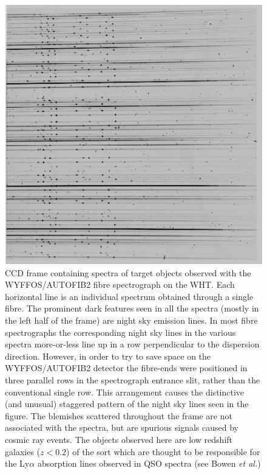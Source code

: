 \documentclass[twoside,11pt]{starlink}
\begin{document}
\begin{figure}[htbp]
   \centering
   \includegraphics[totalheight=5in]{sc14_objframe}
   \caption[CCD frame of target object spectra acquired with
    WYFFOS/AUTOFIB2]{CCD frame containing spectra of target objects
    observed with the WYFFOS/AUTOFIB2 fibre spectrograph on the WHT.
    Each horizontal line is an individual spectrum obtained through a
    single fibre.  The prominent dark features seen in all the spectra
    (mostly in the left half of the frame) are night sky emission lines.
    In most fibre spectrographs the corresponding night sky lines in the
    various spectra more-or-less line up in a row perpendicular to the
    dispersion direction.  However, in order to try to save space on the
    WYFFOS/AUTOFIB2 detector the fibre-ends were positioned in three
    parallel rows in the spectrograph entrance slit, rather than the
    conventional single row.  This arrangement causes the distinctive (and
    unusual) staggered pattern of the night sky lines seen in the figure.
    The blemishes scattered throughout the frame are not associated with
    the spectra, but are spurious signals caused by cosmic ray events.
    The objects observed here are low redshift galaxies ($z < 0.2$\/) of
    the sort which are thought to be responsible for the Ly$\alpha$
    absorption lines observed in QSO spectra (see Bowen \textit{et
    al.}\/\cite{BOWEN98})
   \label{OBJFRAME} }
\end{figure}
\end{document}
